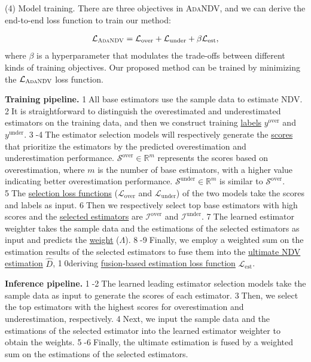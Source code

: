 \noindent (4) Model training. There are three objectives in \textsc{AdaNDV}, and we can derive the end-to-end loss function to train our method:

\begin{align}
    \mathcal{L}_{\mathrm{\textsc{AdaNDV}}}=\mathcal{L}_{\mathrm{over}}+\mathcal{L}_{\mathrm{under}}+\beta \mathcal{L}_{\mathrm{est}},
    \label{eq:loss}
\end{align}
where $\beta$ is a hyperparameter that modulates the trade-offs between different kinds of training objectives. Our proposed method can be trained by minimizing the $\mathcal{L}_{\mathrm{\textsc{AdaNDV}}}$ loss function.



\noindent\textbf{Training pipeline.}
\textcircled{1}All base estimators use the sample data to estimate NDV. \textcircled{2}It is straightforward to distinguish the overestimated and underestimated estimators on the training data, and then we construct training \underline{labels} $y^{\mathrm{over}}$ and $y^{\mathrm{under}}$. \textcircled{3}-\textcircled{4}The estimator selection models will respectively generate the \underline{scores} that prioritize the estimators by the predicted overestimation and underestimation performance. $\mathcal{S}^{\mathrm{over}}\in\mathbb{R}^m$ represents the scores based on overestimation, where $m$ is the number of base estimators, with a higher value indicating better overestimation performance. $\mathcal{S}^{\mathrm{under}}\in\mathbb{R}^m$ is similar to $\mathcal{S}^{\mathrm{over}}$.
\textcircled{5}The \underline{selection loss functions} ($\mathcal{L}_{\mathrm{over}}$ and $\mathcal{L}_{\mathrm{under}}$) of the two models take the scores and labels as input. \textcircled{6}Then we respectively select top base estimators with high scores and the \underline{selected estimators} are $\mathcal{I}^{\mathrm{over}}$ and $\mathcal{I}^{\mathrm{under}}$. \textcircled{7}The learned estimator weighter takes the sample data and the estimations of the selected estimators as input and predicts the \underline{weight} ($\Lambda$). \textcircled{8}-\textcircled{9}Finally, we employ a weighted sum on the estimation results of the selected estimators to fuse them into the \underline{ultimate NDV estimation} $\hat{D}$, \textcircled{\footnotesize 10}deriving \underline{fusion-based estimation loss function} $\mathcal{L}_{\mathrm{est}}$.


\noindent\textbf{Inference pipeline.} \textcircled{1}-\textcircled{2}The learned leading estimator selection models take the sample data as input to generate the scores of each estimator. \textcircled{3}Then, we select the top estimators with the highest scores for overestimation and underestimation, respectively. \textcircled{4}Next, we input the sample data and the estimations of the selected estimator into the learned estimator weighter to obtain the weights. \textcircled{5}-\textcircled{6}Finally, the ultimate estimation is fused by a weighted sum on the estimations of the selected estimators.




